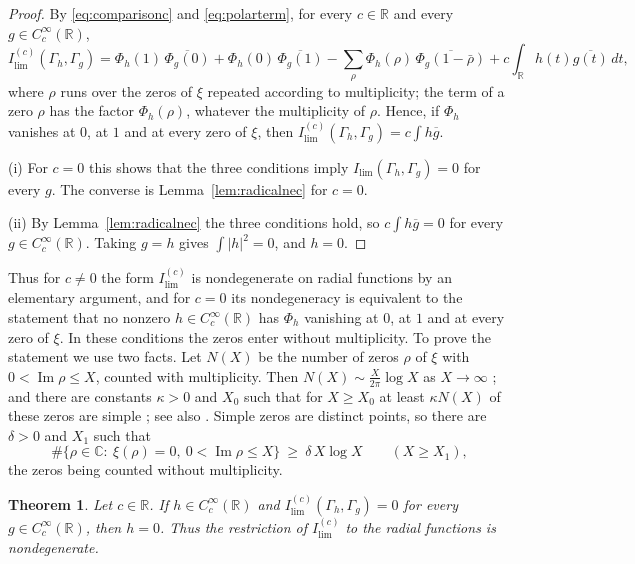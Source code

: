 \documentclass[11pt]{amsart}
\newtheorem{theorem}{Theorem}[section]
\theoremstyle{remark}
\numberwithin{equation}{section}
\newcommand{\C}{\mathbb C}
\newcommand{\R}{\mathbb R}
\newcommand{\Iml}{\operatorname{Im}}
\newcommand{\Il}{I_{\lim}}
\begin{document}
\begin{proof}
By \eqref{eq:comparisonc} and \eqref{eq:polarterm}, for every $c\in\R$ and
every $g\in C_c^\infty(\R)$,
\begin{equation}
\label{eq:radicalid}
  I^{(c)}_{\lim}(\Gamma_h,\Gamma_g)
  =\Phi_h(1)\,\overline{\Phi_g(0)}+\Phi_h(0)\,\overline{\Phi_g(1)}
   -\sum_\rho\Phi_h(\rho)\,\overline{\Phi_g(1-\bar\rho)}
   +c\int_\R h(t)\overline{g(t)}\,dt ,
\end{equation}
where $\rho$ runs over the zeros of $\xi$ repeated according to
multiplicity; the term of a zero $\rho$ has the factor $\Phi_h(\rho)$,
whatever the multiplicity of $\rho$.  Hence, if $\Phi_h$ vanishes at $0$, at
$1$ and at every zero of $\xi$, then
$I^{(c)}_{\lim}(\Gamma_h,\Gamma_g)=c\int h\overline g$.

(i) For $c=0$ this shows that the three conditions imply
$\Il(\Gamma_h,\Gamma_g)=0$ for every $g$.  The converse is
Lemma~\ref{lem:radicalnec} for $c=0$.

(ii) By Lemma~\ref{lem:radicalnec} the three conditions hold, so
$c\int h\overline g=0$ for every $g\in C_c^\infty(\R)$.  Taking $g=h$ gives
$\int|h|^2=0$, and $h=0$.
\end{proof}

Thus for $c\ne0$ the form $I^{(c)}_{\lim}$ is nondegenerate on radial
functions by an elementary argument, and for $c=0$ its nondegeneracy is
equivalent to the statement that no nonzero $h\in C_c^\infty(\R)$ has
$\Phi_h$ vanishing at $0$, at $1$ and at every zero of $\xi$.  In these
conditions the zeros enter without multiplicity.  To prove the statement we
use two facts.  Let $N(X)$ be the number of zeros $\rho$ of $\xi$ with
$0<\Iml\rho\le X$, counted with multiplicity.  Then
$N(X)\sim\frac{X}{2\pi}\log X$ as $X\to\infty$ \cite[ch.~15]{Davenport}; and
there are constants $\kappa>0$ and $X_0$ such that for $X\ge X_0$ at least
$\kappa N(X)$ of these zeros are simple \cite{HeathBrown}; see also
\cite{Conrey}.  Simple zeros are distinct points, so there are $\delta>0$
and $X_1$ such that
\begin{equation}
\label{eq:distinct}
  \#\bigl\{\rho\in\C:\ \xi(\rho)=0,\ 0<\Iml\rho\le X\bigr\}
  \ \ge\ \delta\,X\log X\qquad(X\ge X_1),
\end{equation}
the zeros being counted without multiplicity.

\begin{theorem}
\label{thm:radicallim}
Let $c\in\R$.  If $h\in C_c^\infty(\R)$ and
$I^{(c)}_{\lim}(\Gamma_h,\Gamma_g)=0$ for every $g\in C_c^\infty(\R)$, then
$h=0$.  Thus the restriction of $I^{(c)}_{\lim}$ to the radial functions is
nondegenerate.
\end{theorem}
\end{document}
